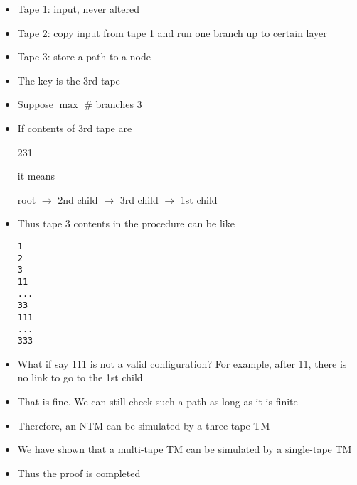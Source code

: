\begin{frame}
\begin{itemize}
\begin{center}
\end{center}
  
\item 
Tape 1: input, never altered

\item
  Tape 2: copy input from tape 1 and run one branch up to certain layer
  
\item
  Tape 3: store a path to a node

\item
  The key is the 3rd tape

\item
  Suppose $\max$ \# branches 3

\item If contents of 3rd tape are
  \begin{center}
    231
  \end{center}
  it means
  \begin{center}
      root $\rightarrow$ 2nd child $\rightarrow$ 3rd child $\rightarrow$ 1st child
  \end{center}
\item Thus tape 3 contents in the procedure can be like
\begin{alltt}
1
2
3
11
...
33
111
...
333
\end{alltt}
\item What if say 111 is not a valid configuration? For example,
  after 11, there is no link to go to the 1st child
\item That is fine. We can still check such a path as long as it
  is finite
\item Therefore, an NTM can be simulated by a three-tape TM
\item
  We have shown that a multi-tape TM can be simulated
  by a single-tape TM
\item
  Thus the proof is completed
\end{itemize}\end{frame}


